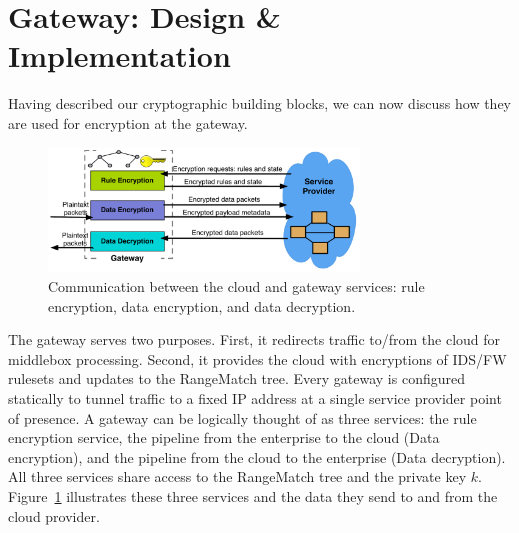 \section{Gateway: Design \& Implementation}

\label{sec:gateway}
Having described our cryptographic building blocks, we can now discuss how they are used for encryption at the gateway.

\begin{figure}[t]
  \centering
  \includegraphics[width=3.25in]{fig/gateway2cloud}
  \caption[]{\label{fig:gatewaymeta} Communication between the cloud and gateway services: rule encryption, data encryption, and data decryption.} 
\end{figure}



The gateway serves two purposes. First, it redirects traffic to/from the cloud for middlebox processing. Second, it provides the cloud with encryptions of IDS/FW rulesets and updates to the RangeMatch tree.
Every gateway is configured statically to tunnel traffic to a fixed IP address at a single service provider point of presence.
A gateway can be logically thought of as three services: the rule encryption service, the pipeline from the enterprise to the cloud (Data encryption), and the pipeline from the cloud to the enterprise (Data decryption). 
All three services share access to the RangeMatch tree and the private key $k$.
Figure~\ref{fig:gatewaymeta} illustrates  these three services and the data they send to and from the cloud provider.

